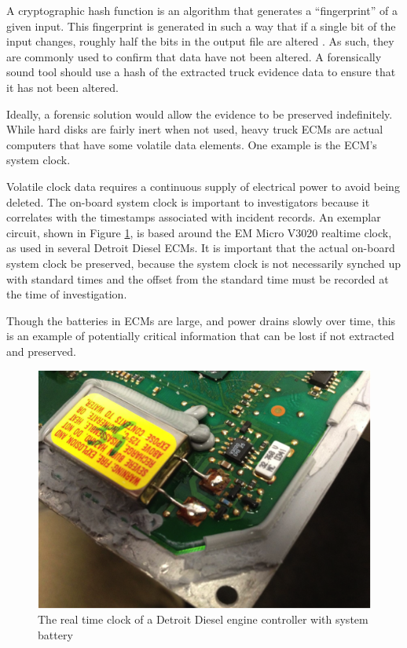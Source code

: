 
A cryptographic hash function is an algorithm that generates a “fingerprint” of a given input. This fingerprint is generated in such a way that if a single bit of the input changes, 
roughly half the bits in the output file are altered \cite{schneier1996}. As such, they are commonly used to confirm that data have not been altered. A forensically sound tool should use a hash of 
the extracted truck evidence data to ensure that it has not been altered.


Ideally, a forensic solution would allow the evidence to be preserved indefinitely. While hard disks are fairly inert when not used, heavy truck ECMs are actual computers that 
have some volatile data elements. One example is the ECM's system clock.

Volatile clock data requires a continuous supply of electrical power to avoid being deleted. The on-board 
system clock is important to investigators because it correlates with the timestamps associated with incident records. An exemplar circuit, shown in Figure \ref{fig:clockbatt}, is based around 
the EM Micro V3020 realtime clock, as used in several Detroit Diesel ECMs.  It is important that the actual on-board system clock be preserved, because the system clock is not necessarily synched 
up with standard times and the offset from the standard time must be recorded at the time of investigation.

Though the batteries in ECMs are large, and power drains slowly over time, this is an example of potentially critical information that can be lost if not extracted and preserved.

\begin{figure}[h]
  \centering
  \includegraphics{clockbatt}
  \caption{The real time clock of a Detroit Diesel engine controller with system battery}
  \label{fig:clockbatt}

\end{figure}

